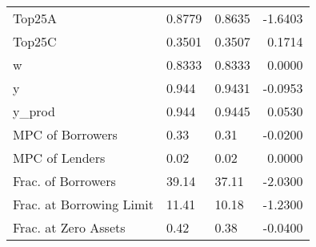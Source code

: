 \begin{table}
\begin{tabular}{lllr}
                  Top25A &  0.8779 &   0.8635 & -1.6403 \\
                  Top25C &  0.3501 &   0.3507 &  0.1714 \\
                       w &  0.8333 &   0.8333 &  0.0000 \\
                       y &   0.944 &   0.9431 & -0.0953 \\
                  y\_prod &   0.944 &   0.9445 &  0.0530 \\
        MPC of Borrowers &    0.33 &     0.31 & -0.0200 \\
          MPC of Lenders &    0.02 &     0.02 &  0.0000 \\
      Frac. of Borrowers &   39.14 &    37.11 & -2.0300 \\
Frac. at Borrowing Limit &   11.41 &    10.18 & -1.2300 \\
    Frac. at Zero Assets &    0.42 &     0.38 & -0.0400 \\
\bottomrule
\end{tabular}
\end{table}
